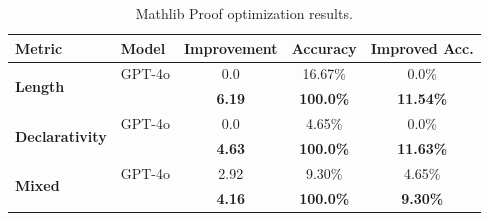 \begin{table}[h]
\caption{Mathlib Proof optimization results.}
\label{tab:main-lib}
\centering
\small
\begin{tabular}{ll|ccc}
\toprule
Metric& Model &Improvement &Accuracy& Improved Acc.\\
\midrule
\multirow{2}{*}{\textbf{Length}} & GPT-4o & 0.0 & 16.67\% & 0.0\% \\
&\methodname{} & \textbf{6.19} & \textbf{100.0\%} & \textbf{11.54\%}\\
\midrule
\multirow{2}{*}{\textbf{Declarativity}} & GPT-4o & 0.0 & 4.65\% & 0.0\% \\
&\methodname{} & \textbf{4.63} & \textbf{100.0\%} & \textbf{11.63\%}\\
\midrule
\multirow{2}{*}{\textbf{Mixed}} & GPT-4o &2.92 & 9.30\% & 4.65\% \\
&\methodname{} & \textbf{4.16} & \textbf{100.0\%} & \textbf{9.30\%}\\
\bottomrule
\end{tabular}



\vspace{-1em} %
\end{table}

